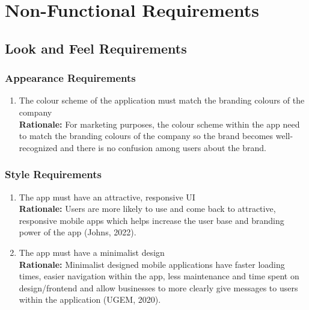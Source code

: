 \documentclass[]{article}
\begin{document}

\section{Non-Functional Requirements}
\label{sec:non-functional_requirements}

\subsection{Look and Feel Requirements}
\label{sub:look_and_feel_requirements}

\subsubsection{Appearance Requirements}
\label{ssub:appearance_requirements}
\begin{enumerate}[{LF-A}1. ]
	\item The colour scheme of the application must match the branding colours of the company \\
	{\bf Rationale:} For marketing purposes, the colour scheme within the app need to match the branding colours of the company so the brand becomes well-recognized and there is no confusion among users about the brand.
\end{enumerate}

\subsubsection{Style Requirements}
\label{ssub:style_requirements}
\begin{enumerate}[{LF-S}1. ]
	\item The app must have an attractive, responsive UI \\
	{\bf Rationale:} Users are more likely to use and come back to attractive, responsive mobile apps which helps increase the user base and branding power of the app (Johns, 2022). 
	\item The app must have a minimalist design \\
	{\bf Rationale:} Minimalist designed mobile applications have faster loading times, easier navigation within the app, less maintenance and time spent on design/frontend and allow businesses to more clearly give messages to users within the application (UGEM, 2020).
\end{enumerate}
\end{document}
